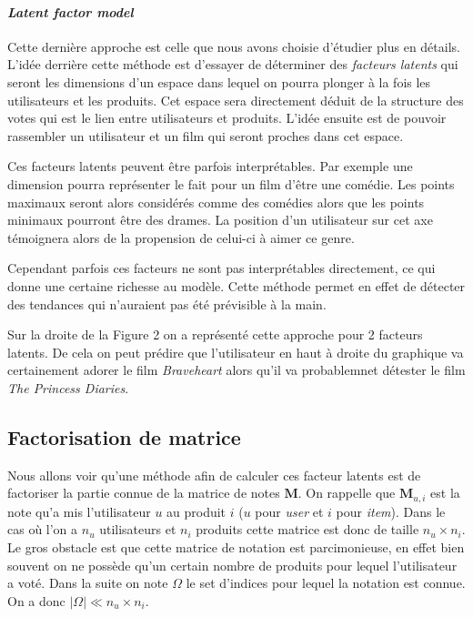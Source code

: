 \documentclass[10pt,a4paper]{article}
\begin{document}
\paragraph{\textit{Latent factor model}}

Cette dernière approche est celle que nous avons choisie d'étudier plus en détails. L'idée derrière cette méthode est d'essayer de déterminer des \textit{facteurs latents} qui seront les dimensions d'un espace dans lequel on pourra plonger à la fois les utilisateurs et les produits. Cet espace sera directement déduit de la structure des votes qui est le lien entre utilisateurs et produits. L'idée ensuite est de pouvoir rassembler un utilisateur et un film qui seront proches dans cet espace. 

Ces facteurs latents peuvent être parfois interprétables. Par exemple une dimension pourra représenter le fait pour un film d'être une comédie. Les points maximaux seront alors considérés comme des comédies alors que les points minimaux pourront être des drames. La position d'un utilisateur sur cet axe témoignera alors de la propension de celui-ci à aimer ce genre. 

Cependant parfois ces facteurs ne sont pas interprétables directement, ce qui donne une certaine richesse au modèle. Cette méthode permet en effet de détecter des tendances qui n'auraient pas été prévisible à la main.

Sur la droite de la Figure 2 on a représenté cette approche pour 2 facteurs latents. De cela on peut prédire que l'utilisateur en haut à droite du graphique va certainement adorer le film \textit{Braveheart} alors qu'il va probablemnet détester le film \textit{The Princess Diaries}.

\subsection{Factorisation de matrice}

Nous allons voir qu'une méthode afin de calculer ces facteur latents est de factoriser la partie connue de la matrice de notes $\textbf{M}$. On rappelle que $\textbf{M}_{u,i}$ est la note qu'a mis l'utilisateur $u$ au produit $i$ ($u$ pour \textit{user} et $i$ pour \textit{item}). Dans le cas où l'on a $n_u$ utilisateurs et $n_i$ produits cette matrice est donc de taille $n_u\times n_i$. Le gros obstacle est que cette matrice de notation est parcimonieuse, en effet bien souvent on ne possède qu'un certain nombre de produits pour lequel l'utilisateur a voté. Dans la suite on note $\Omega$ le set d'indices pour lequel la notation est connue. On a donc $|\Omega|\ll n_u\times n_i$. 
\end{document}
